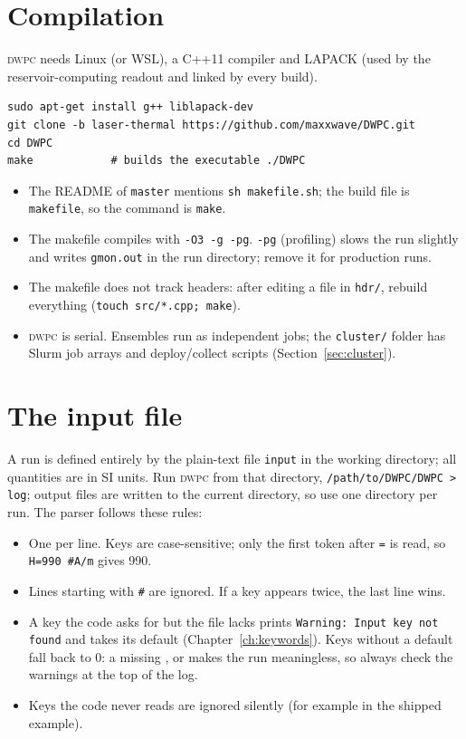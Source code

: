 \documentclass[11pt,a4paper]{report}
\newcommand{\key}[1]{\texttt{\detokenize{#1}}}
\newcommand{\dwpc}{\textsc{dwpc}}
\begin{document}
\section{Compilation}
\dwpc{} needs Linux (or WSL), a C++11 compiler and LAPACK (used by the reservoir-computing readout and linked by every build).
\begin{lstlisting}
sudo apt-get install g++ liblapack-dev
git clone -b laser-thermal https://github.com/maxxwave/DWPC.git
cd DWPC
make            # builds the executable ./DWPC
\end{lstlisting}
\begin{itemize}
\item The README of \texttt{master} mentions \texttt{sh makefile.sh}; the build file is \texttt{makefile}, so the command is \texttt{make}.
\item The makefile compiles with \texttt{-O3 -g -pg}. \texttt{-pg} (profiling) slows the run slightly and writes \texttt{gmon.out} in the run directory; remove it for production runs.
\item The makefile does not track headers: after editing a file in \texttt{hdr/}, rebuild everything (\texttt{touch src/*.cpp; make}).
\item \dwpc{} is serial. Ensembles run as independent jobs; the \texttt{cluster/} folder has Slurm job arrays and deploy/collect scripts (Section~\ref{sec:cluster}).
\end{itemize}

\section{The input file}
A run is defined entirely by the plain-text file \texttt{input} in the working directory; all quantities are in SI units. Run \dwpc{} from that directory, \texttt{/path/to/DWPC/DWPC > log}; output files are written to the current directory, so use one directory per run. The parser follows these rules:
\begin{itemize}
\item One \key{key=value} per line. Keys are case-sensitive; only the first token after \texttt{=} is read, so \texttt{H=990 \#A/m} gives 990.
\item Lines starting with \texttt{\#} are ignored. If a key appears twice, the last line wins.
\item A key the code asks for but the file lacks prints \texttt{Warning: Input key not found} and takes its default (Chapter~\ref{ch:keywords}). Keys without a default fall back to 0: a missing \key{Ms}, \key{Lz} or \key{Dt} makes the run meaningless, so always check the warnings at the top of the log.
\item Keys the code never reads are ignored silently (for example \key{pin} in the shipped example).
\end{itemize}
\end{document}

